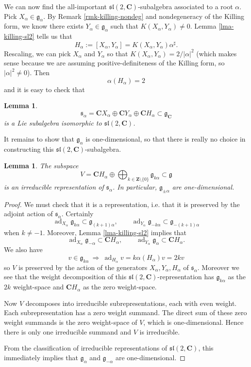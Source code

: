 \documentclass[12pt]{article}
\newcommand{\CC}{\mathbf{C}}
\newcommand{\ZZ}{\mathbf{Z}}
\newcommand{\OP}{\operatorname}
\newcommand{\ad}{\OP{ad}}
\newtheorem{lma}[thm]{Lemma}
\theoremstyle{definition}
\theoremstyle{check}
\theoremstyle{remark}
\theoremstyle{TheoremNum}
\begin{document}
We can now find the all-important $\mathfrak{sl}(2,\CC)$-subalgebra associated to a root $\alpha$. Pick $X_{\alpha}\in\mathfrak{g}_{\alpha}$. By Remark \ref{rmk-killing-nondeg} and nondegeneracy of the Killing form, we know there exists $Y_{\alpha}\in\mathfrak{g}_{\alpha}$ such that $K(X_{\alpha},Y_{\alpha})\neq 0$. Lemma \ref{lma-killing-sl2} tells us that
\[H_{\alpha}:=[X_{\alpha},Y_{\alpha}]=K(X_{\alpha},Y_{\alpha})\alpha^{\sharp}.\]
Rescaling, we can pick $X_{\alpha}$ and $Y_{\alpha}$ so that $K(X_{\alpha},Y_{\alpha})=2/|\alpha|^2$ (which makes sense because we are assuming positive-definiteness of the Killing form, so $|\alpha|^2\neq 0$). Then
\[\alpha(H_{\alpha})=2\]
and it is easy to check that
\begin{lma}
\[\mathfrak{s}_{\alpha}=\CC X_{\alpha}\oplus\CC Y_{\alpha}\oplus\CC H_{\alpha}\subset\mathfrak{g}_{\CC}\]
is a Lie subalgebra isomorphic to $\mathfrak{sl}(2,\CC)$.
\end{lma}
It remains to show that $\mathfrak{g}_{\alpha}$ is one-dimensional, so that there is really no choice in constructing this $\mathfrak{sl}(2,\CC)$-subalgebra.
\begin{lma}
The subspace
\[V=\CC H_{\alpha}\oplus\bigoplus_{k\in\ZZ\setminus\{0\}}\mathfrak{g}_{k\alpha}\subset\mathfrak{g}\]
is an irreducible representation of $\mathfrak{s}_{\alpha}$. In particular, $\mathfrak{g}_{\pm\alpha}$ are one-dimensional.
\end{lma}
\begin{proof}
We must check that it is a representation, i.e. that it is preserved by the adjoint action of $\mathfrak{s}_{\alpha}$. Certainly
\[\ad_{X_{\alpha}}\mathfrak{g}_{k\alpha}\subset\mathfrak{g}_{(k+1)\alpha},\qquad\ad_{Y_{\alpha}}\mathfrak{g}_{-k\alpha}\subset\mathfrak{g}_{-(k+1)\alpha}\]
when $k\neq -1$. Moreover, Lemma \ref{lma-killing-sl2} implies that
\[\ad_{X_{\alpha}}\mathfrak{g}_{-\alpha}\subset\CC H_{\alpha},\qquad\ad_{Y_{\alpha}}\mathfrak{g}_{\alpha}\subset\CC H_{\alpha}.\]
We also have
\[v\in\mathfrak{g}_{k\alpha}\ \Rightarrow\ \ad_{H_{\alpha}}v=k\alpha(H_{\alpha})v=2kv\]
so $V$ is preserved by the action of the generators $X_{\alpha},Y_{\alpha},H_{\alpha}$ of $\mathfrak{s}_{\alpha}$. Moreover we see that the weight decomposition of this $\mathfrak{sl}(2,\CC)$-representation has $\mathfrak{g}_{k\alpha}$ as the $2k$ weight-space and $\CC H_{\alpha}$ as the zero weight-space.

Now $V$ decomposes into irreducible subrepresentations, each with even weight. Each subrepresentation has a zero weight summand. The direct sum of these zero weight summands is the zero weight-space of $V$, which is one-dimensional. Hence there is only one irreducible summand and $V$ is irreducible.

From the classification of irreducible representations of $\mathfrak{sl}(2,\CC)$, this immediately implies that $\mathfrak{g}_{\alpha}$ and $\mathfrak{g}_{-\alpha}$ are one-dimensional.
\end{proof}
\end{document}
